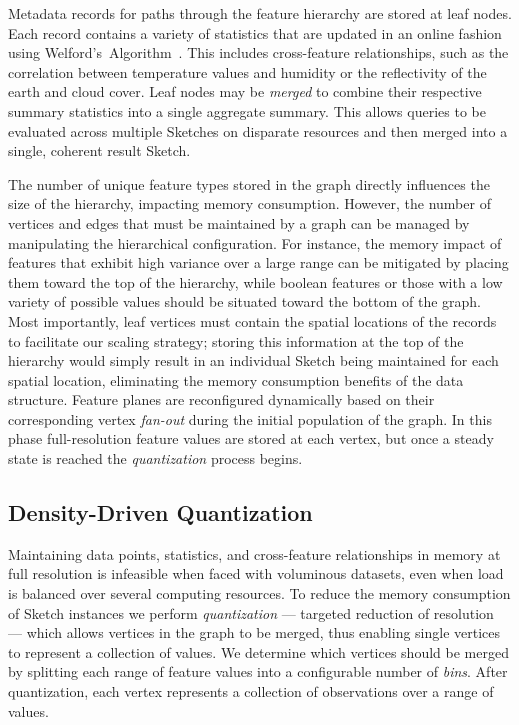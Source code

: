 Metadata records for paths through the feature hierarchy are stored at leaf nodes. Each record contains a variety of statistics that are updated in an online fashion using Welford's~Algorithm~\cite{welford1962note}. This includes cross-feature relationships, such as the correlation between temperature values and humidity or the reflectivity of the earth and cloud cover. Leaf nodes may be \emph{merged} to combine their respective summary statistics into a single aggregate summary. This allows queries to be evaluated across multiple Sketches on disparate resources and then merged into a single, coherent result Sketch.

The number of unique feature types stored in the graph directly influences the size of the hierarchy, impacting memory consumption. However, the number of vertices and edges that must be maintained by a graph can be managed by manipulating the hierarchical configuration. For instance, the memory impact of features that exhibit high variance over a large range can be mitigated by placing them toward the top of the hierarchy, while boolean features or those with a low variety of possible values should be situated toward the bottom of the graph. Most importantly, leaf vertices must contain the spatial locations of the records to facilitate our scaling strategy; storing this information at the top of the hierarchy would simply result in an individual Sketch being maintained for each spatial location, eliminating the memory consumption benefits of the data structure. Feature planes are reconfigured dynamically based on their corresponding vertex \emph{fan-out} during the initial population of the graph. In this phase full-resolution feature values are stored at each vertex, but once a steady state is reached the \emph{quantization} process begins.

\subsection{Density-Driven Quantization}
Maintaining data points, statistics, and cross-feature relationships in memory at full resolution is infeasible when faced with voluminous datasets, even when load is balanced over several computing resources. To reduce the memory consumption of Sketch instances we perform \emph{quantization} --- targeted reduction of resolution --- which allows vertices in the graph to be merged, thus enabling single vertices to represent a collection of values. We determine which vertices should be merged by splitting each range of feature values into a configurable number of \emph{bins}. After quantization, each vertex represents a collection of observations over a range of values.

